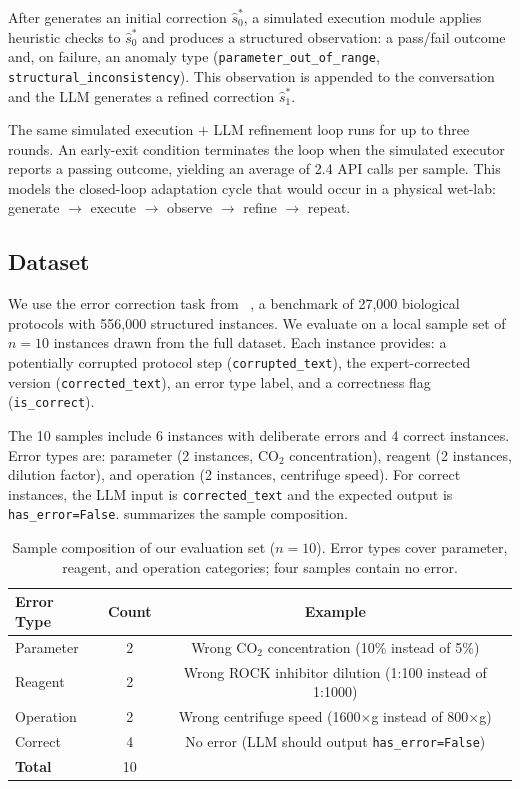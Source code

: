 After \toolaug generates an initial correction $\hat{s}^*_0$, a simulated execution module applies heuristic checks to $\hat{s}^*_0$ and produces a structured observation: a pass/fail outcome and, on failure, an anomaly type (\eg \texttt{parameter\_out\_of\_range}, \texttt{structural\_inconsistency}).
This observation is appended to the conversation and the LLM generates a refined correction $\hat{s}^*_1$.

The same simulated execution + LLM refinement loop runs for up to three rounds.
An early-exit condition terminates the loop when the simulated executor reports a passing outcome, yielding an average of 2.4 API calls per sample.
This models the closed-loop adaptation cycle that would occur in a physical wet-lab: generate $\to$ execute $\to$ observe $\to$ refine $\to$ repeat.

\subsection{Dataset}
\label{sec:method:data}

We use the error correction task from \bioprobench~\cite{bioprobench2025}, a benchmark of 27,000 biological protocols with 556,000 structured instances.
We evaluate on a local sample set of $n=10$ instances drawn from the full dataset.
Each instance provides: a potentially corrupted protocol step (\texttt{corrupted\_text}), the expert-corrected version (\texttt{corrected\_text}), an error type label, and a correctness flag (\texttt{is\_correct}).

The 10 samples include 6 instances with deliberate errors and 4 correct instances.
Error types are: parameter (2 instances, \eg CO$_2$ concentration), reagent (2 instances, \eg dilution factor), and operation (2 instances, \eg centrifuge speed).
For correct instances, the LLM input is \texttt{corrected\_text} and the expected output is \texttt{has\_error=False}.
 summarizes the sample composition.

\begin{table}[t]
\centering
\caption{Sample composition of our \bioprobench evaluation set ($n=10$). Error types cover parameter, reagent, and operation categories; four samples contain no error.}
\label{tab:dataset}
\small
\begin{tabular}{@{}lcc@{}}
\toprule
\textbf{Error Type} & \textbf{Count} & \textbf{Example} \\
\midrule
Parameter & 2 & Wrong CO$_2$ concentration (10\% instead of 5\%) \\
Reagent   & 2 & Wrong ROCK inhibitor dilution (1:100 instead of 1:1000) \\
Operation & 2 & Wrong centrifuge speed (1600$\times$g instead of 800$\times$g) \\
Correct   & 4 & No error (LLM should output \texttt{has\_error=False}) \\
\midrule
\textbf{Total} & 10 & \\
\bottomrule
\end{tabular}
\end{table}

